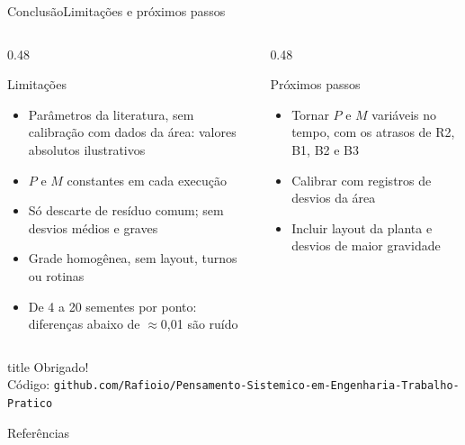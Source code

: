 \documentclass[aspectratio=169, 10pt]{beamer}
\begin{document}
\begin{frame}{Conclusão}{Limitações e próximos passos}
  \begin{columns}[T]
    \begin{column}{0.48\textwidth}
      \begin{alertblock}{Limitações}
        \begin{itemize}
          \item Parâmetros da literatura, sem calibração com dados da área: valores absolutos ilustrativos
          \item $P$ e $M$ constantes em cada execução
          \item Só descarte de resíduo comum; sem desvios médios e graves
          \item Grade homogênea, sem layout, turnos ou rotinas
          \item De 4 a 20 sementes por ponto: diferenças abaixo de $\approx$0,01 são ruído
        \end{itemize}
      \end{alertblock}
    \end{column}
    \begin{column}{0.48\textwidth}
      \begin{block}{Próximos passos}
        \begin{itemize}
          \item Tornar $P$ e $M$ variáveis no tempo, com os atrasos de R2, B1, B2 e B3
          \item Calibrar com registros de desvios da área
          \item Incluir layout da planta e desvios de maior gravidade
        \end{itemize}
      \end{block}
    \end{column}
  \end{columns}
\end{frame}

\begin{frame}[plain]
  \vfill\centering
  \begin{beamercolorbox}[sep=10pt, center, rounded=true, shadow=true]{title}
    Obrigado!\\[2pt]
    Código: \texttt{github.com/Rafioio/Pensamento-Sistemico-em-Engenharia-Trabalho-Pratico}
  \end{beamercolorbox}
  \vfill
\end{frame}

\begin{frame}{Referências}
  \tiny
  
  
\end{frame}
\end{document}

